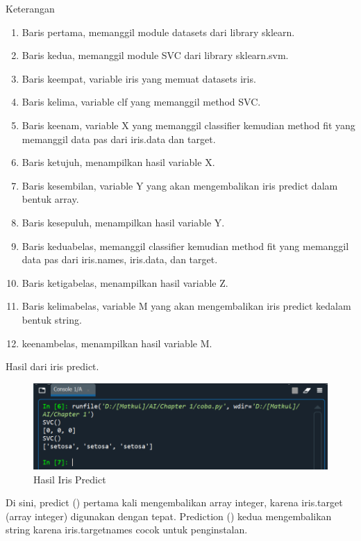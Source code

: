 \par Keterangan 
    \begin{enumerate}
        \item Baris pertama, memanggil module datasets dari library sklearn.
        \item Baris kedua, memanggil module SVC dari library sklearn.svm.
        \item Baris keempat, variable iris yang memuat datasets iris.
        \item Baris kelima, variable clf yang memanggil method SVC.
        \item Baris keenam, variable X yang memanggil classifier kemudian method fit yang memanggil data pas dari iris.data dan target.
        \item Baris ketujuh, menampilkan hasil variable X.
        \item Baris kesembilan, variable Y yang akan mengembalikan iris predict dalam bentuk array.
        \item Baris kesepuluh, menampilkan hasil variable Y.
        \item Baris keduabelas, memanggil classifier kemudian method fit yang memanggil data pas dari iris.names, iris.data, dan target.
        \item Baris ketigabelas, menampilkan hasil variable Z.
        \item Baris kelimabelas, variable M yang akan mengembalikan iris predict kedalam bentuk string.
        \item keenambelas, menampilkan hasil variable M.
    \end{enumerate}

\par Hasil dari iris predict.

    \begin{figure}[H]
    \centering
    \includegraphics[width=13cm]{figures/chapter1/23.PNG}
    \caption{Hasil Iris Predict}
    \end{figure}
    
\par Di sini, predict () pertama kali mengembalikan array integer, karena iris.target (array integer) digunakan dengan tepat. Prediction () kedua mengembalikan string karena iris.targetnames cocok untuk penginstalan.

